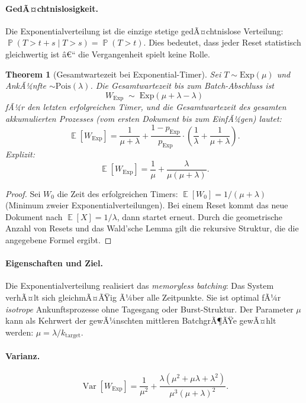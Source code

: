 ﻿\documentclass[12pt, a4paper]{article}
\newtheorem{theorem}{Theorem}[section]
\DeclareMathOperator{\E}{\mathbb{E}}
\DeclareMathOperator{\Var}{Var}
\DeclareMathOperator{\Prob}{\mathbb{P}}
\newcommand{\Exp}{\mathrm{Exp}}
\newcommand{\Pois}{\mathrm{Pois}}
\begin{document}
\paragraph{GedÃ¤chtnislosigkeit.}
Die Exponentialverteilung ist die einzige stetige gedÃ¤chtnislose Verteilung:
$\Prob(T > t+s \mid T > s) = \Prob(T > t)$. Dies bedeutet, dass jeder Reset
statistisch gleichwertig ist â€“ die Vergangenheit spielt keine Rolle.

\begin{theorem}[Gesamtwartezeit bei Exponential-Timer]
\label{thm:expwait}
Sei $T \sim \Exp(\mu)$ und AnkÃ¼nfte $\sim \Pois(\lambda)$.
Die Gesamtwartezeit bis zum Batch-Abschluss ist
\[
  W_{\Exp} \;\sim\; \Exp(\mu + \lambda - \lambda)
\]
fÃ¼r den letzten erfolgreichen Timer, und die Gesamtwartezeit des gesamten
akkumulierten Prozesses (vom ersten Dokument bis zum EinfÃ¼gen) lautet:
\[
  \E[W_{\Exp}] = \frac{1}{\mu + \lambda} + \frac{1-p_{\Exp}}{p_{\Exp}} \cdot
  \left(\frac{1}{\lambda} + \frac{1}{\mu+\lambda}\right).
\]
Explizit:
\[
  \E[W_{\Exp}] = \frac{1}{\mu} + \frac{\lambda}{\mu(\mu+\lambda)}.
\]
\end{theorem}

\begin{proof}
Sei $W_0$ die Zeit des erfolgreichen Timers: $\E[W_0] = 1/(\mu+\lambda)$
(Minimum zweier Exponentialverteilungen). Bei einem Reset kommt das neue
Dokument nach $\E[X] = 1/\lambda$, dann startet erneut. Durch die geometrische
Anzahl von Resets und das Wald'sche Lemma gilt die rekursive Struktur, die die
angegebene Formel ergibt.
\end{proof}

\paragraph{Eigenschaften und Ziel.}
Die Exponentialverteilung realisiert das \emph{memoryless batching}: Das System
verhÃ¤lt sich gleichmÃ¤ÃŸig Ã¼ber alle Zeitpunkte. Sie ist optimal fÃ¼r
\emph{isotrope} Ankunftsprozesse ohne Tagesgang oder Burst-Struktur. Der
Parameter $\mu$ kann als Kehrwert der gewÃ¼nschten mittleren BatchgrÃ¶ÃŸe gewÃ¤hlt
werden: $\mu = \lambda / k_{\mathrm{target}}$.

\paragraph{Varianz.}
\[
  \Var[W_{\Exp}] = \frac{1}{\mu^2} + \frac{\lambda(\mu^2 + \mu\lambda +
  \lambda^2)}{\mu^3(\mu+\lambda)^2}.
\]
\end{document}
